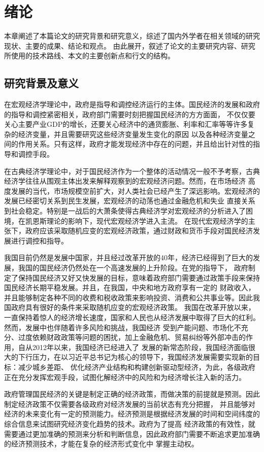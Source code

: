 \section{绪论}
本章阐述了本篇论文的研究背景和研究意义，综述了国内外学者在相关领域的研究现状、主要的成果、结论和观点。
由此展开，叙述了论文的主要研究内容、研究所使用的技术路线、本文的主要创新点和行文的结构。
\subsection{研究背景及意义}
在宏观经济学理论中，政府是指导和调控经济运行的主体。国民经济的发展和政府的指导和调控紧密相关，政府部门需要时刻把握国民经济的方方面面，
不仅仅要关心主要产业GDP的增长，还要关心经济中的通货膨胀、利率和汇率等等许多复杂的经济变量，并且需要研究这些经济变量发生变化的原因
以及各种经济变量之间的作用关系。只有这样，政府才能发现经济中存在的问题，并且给出针对性的指导和调控手段。

在古典经济学理论中，对于国民经济作为一个整体的活动情况一般不予考察，古典经济学往往从围观主体出发来解释观察到的宏观经济问题。然而，在市场经济
高度发展的当代，市场规模空前扩大，对人类社会已经产生了深远影响。宏观经济的发展已经密切关系到民生发展，宏观经济的动荡也通过金融危机和失业
直接关系到社会稳定。特别是一战后的大萧条使得古典经济学对宏观经济的分析进入了困境，在凯恩斯理论的影响下，现代宏观经济学进入主流。
在现代宏观经济学的主张下，政府应该采取随机应变的宏观经济政策，通过财政和货币手段对国民经济发展进行调控和指导。

我国目前仍然是发展中国家，并且经过改革开放的40年，经济已经得到了巨大的发展，我国的国民经济仍然处在一个高速发展的上升阶段。在党的指导下，
政府制定了保持国民经济又好又快发展的目标，意味着政府部门需要通过政策手段来保持国民经济长期平稳发展。并且，在我国，中央和地方政府享有一定的
财政收入，并且能够制定各种不同的收费和税收政策来影响投资、消费和公共事业等。因此我国政府具有很好的条件来采取随机应变的宏观经济政策。
我国在改革开放以来，一直保持着惊人的经济增长速度，国家和人民也从经济发展中取得了巨大的红利。然而，发展中也伴随着许多风险和挑战，我国经济
受到产能问题、市场化不充分、过度依赖财政政策等问题的困扰，加上金融危机、贸易纠纷等外部冲击的作用，自从2012年以来，我国经济已经进入了
发展的新常态阶段，我国经济面临很大的下行压力，在以习近平总书记为核心的领导下，我国经济发展需要实现新的目标：减少城乡差距、
优化经济产业结构和构建创新驱动型经济，为此，各级政府正在充分发挥宏观手段，试图化解经济中的风险和为经济增长注入新的活力。

政府管理国民经济的关键是制定正确的经济政策，而做决策的前提就是预测。因此制定经济政策不仅需要各级政府对经济发展的当前状态有充分把握，
并且能够对经济的未来变化有一定的预测能力。经济预测是根据经济发展的时间和空间纬度的综合信息来试图研究经济变化趋势的技术。政府为了提高
经济政策的有效性，就需要通过更加准确的预测来分析和判断信息，因此政府部门需要不断追求更加准确的经济预测技术，才能在复杂的经济形式变化中
掌握主动权。

